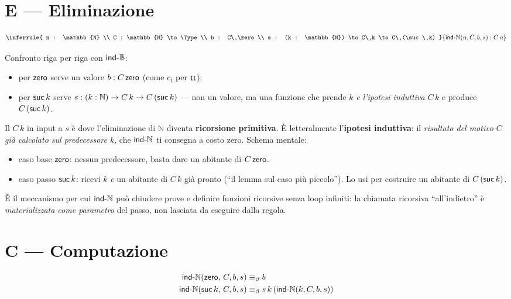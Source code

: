 \section*{E --- Eliminazione}
\[
\inferrule{
n : \mathbb{N} \\
C : \mathbb{N} \to \Type \\
b : C\,\zero \\
s : (k : \mathbb{N}) \to C\,k \to C\,(\suc\,k)
}{
\indN(n, C, b, s) : C\,n
}
\]

Confronto riga per riga con $\mathsf{ind\text{-}\mathbb{B}}$:
\begin{itemize}
\item per $\mathsf{zero}$ serve un valore $b : C\,\mathsf{zero}$ (come $c_t$ per $\mathsf{tt}$);
\item per $\mathsf{suc}\,k$ serve $s : (k : \mathbb{N}) \to C\,k \to C\,(\mathsf{suc}\,k)$ --- non un valore, ma una funzione che prende $k$ \emph{e l'ipotesi induttiva $C\,k$} e produce $C\,(\mathsf{suc}\,k)$.
\end{itemize}

Il $C\,k$ in input a $s$ \`e dove l'eliminazione di $\mathbb{N}$ diventa \textbf{ricorsione primitiva}. \`E letteralmente l'\textbf{ipotesi induttiva}: il \emph{risultato del motivo $C$ gi\`a calcolato sul predecessore $k$}, che $\mathsf{ind\text{-}\mathbb{N}}$ ti consegna a costo zero. Schema mentale:
\begin{itemize}
\item caso base $\mathsf{zero}$: nessun predecessore, basta dare un abitante di $C\,\mathsf{zero}$.
\item caso passo $\mathsf{suc}\,k$: ricevi $k$ \emph{e} un abitante di $C\,k$ gi\`a pronto (``il lemma sul caso pi\`u piccolo''). Lo usi per costruire un abitante di $C\,(\mathsf{suc}\,k)$.
\end{itemize}
\noindent \`E il meccanismo per cui $\mathsf{ind\text{-}\mathbb{N}}$ pu\`o chiudere prove e definire funzioni ricorsive senza loop infiniti: la chiamata ricorsiva ``all'indietro'' \`e \emph{materializzata come parametro} del passo, non lasciata da eseguire dalla regola.

\section*{C --- Computazione}
\begin{align*}
\mathsf{ind\text{-}\mathbb{N}}(\mathsf{zero},\,C, b, s)    &\equiv_{\beta} b \\
\mathsf{ind\text{-}\mathbb{N}}(\mathsf{suc}\,k,\,C, b, s)  &\equiv_{\beta} s\,k\,(\mathsf{ind\text{-}\mathbb{N}}(k, C, b, s))
\end{align*}

